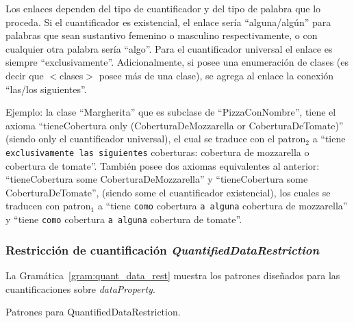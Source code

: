 Los enlaces dependen del tipo de cuantificador y del tipo de palabra que lo proceda. Si el cuantificador es existencial, el enlace sería ``alguna/algún'' para palabras que sean sustantivo femenino o masculino respectivamente, o con cualquier otra palabra sería ``algo''.  Para el cuantificador universal el enlace es siempre ``exclusivamente''. Adicionalmente, si posee una enumeración de clases (es decir que $<$clases$>$ posee más de una clase), se agrega al enlace la conexión ``las/los siguientes''.

Ejemplo: la clase ``Margherita'' que es subclase de ``PizzaConNombre'', tiene el axioma ``tieneCobertura only 
    (CoberturaDeMozzarella or CoberturaDeTomate)'' (siendo only el cuantificador universal), el cual se traduce con el patron$_2$ a ``tiene \texttt{exclusivamente las siguientes} coberturas: cobertura de mozzarella o cobertura de tomate''. También posee dos axiomas equivalentes al anterior: ``tieneCobertura some CoberturaDeMozzarella'' y ``tieneCobertura some CoberturaDeTomate'', (siendo some el cuantificador existencial), los cuales se traducen con patron$_1$ a ``tiene \texttt{como} cobertura \texttt{a alguna} cobertura de mozzarella'' y ``tiene \texttt{como} cobertura \texttt{a alguna} cobertura de tomate''.


\subsubsection{Restricción de cuantificación \emph{QuantifiedDataRestriction}}
La Gramática~\ref{gram:quant_data_rest} muestra los patrones diseñados para las cuantificaciones sobre \emph{dataProperty}.

\begin{GrammarEnv}
\begin{grammar}
\end{grammar}
\caption{Patrones para QuantifiedDataRestriction.}\label{gram:quant_data_rest}
\end{GrammarEnv}


